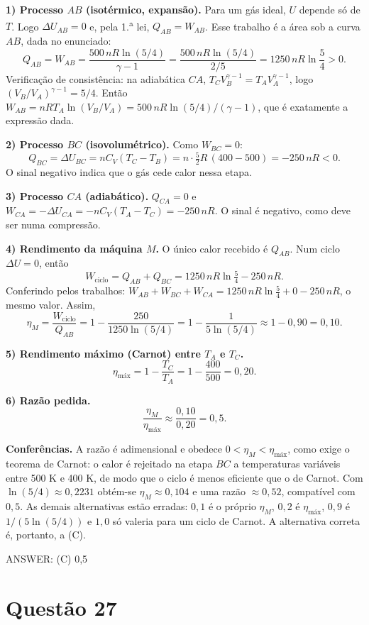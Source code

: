 \documentclass{article}%
\begin{document}
\textbf{1) Processo $AB$ (isotérmico, expansão).} Para um gás ideal, $U$ depende só de $T$. Logo $\Delta U_{AB}=0$ e, pela 1.\textsuperscript{a} lei, $Q_{AB}=W_{AB}$. Esse trabalho é a área sob a curva $AB$, dada no enunciado:
\[
Q_{AB}=W_{AB}=\frac{500\,nR\ln(5/4)}{\gamma-1}=\frac{500\,nR\ln(5/4)}{2/5}=1250\,nR\ln\frac{5}{4}>0 .
\]
Verificação de consistência: na adiabática $CA$, $T_C V_B^{\gamma-1}=T_A V_A^{\gamma-1}$, logo $(V_B/V_A)^{\gamma-1}=5/4$. Então $W_{AB}=nRT_A\ln(V_B/V_A)=500\,nR\ln(5/4)/(\gamma-1)$, que é exatamente a expressão dada.

\textbf{2) Processo $BC$ (isovolumétrico).} Como $W_{BC}=0$:
\[
Q_{BC}=\Delta U_{BC}=nC_V(T_C-T_B)=n\cdot\tfrac{5}{2}R\,(400-500)=-250\,nR<0 .
\]
O sinal negativo indica que o gás cede calor nessa etapa.

\textbf{3) Processo $CA$ (adiabático).} $Q_{CA}=0$ e $W_{CA}=-\Delta U_{CA}=-nC_V(T_A-T_C)=-250\,nR$. O sinal é negativo, como deve ser numa compressão.

\textbf{4) Rendimento da máquina $M$.} O único calor recebido é $Q_{AB}$. Num ciclo $\Delta U=0$, então
\[
W_{\text{ciclo}}=Q_{AB}+Q_{BC}=1250\,nR\ln\tfrac54-250\,nR .
\]
Conferindo pelos trabalhos: $W_{AB}+W_{BC}+W_{CA}=1250\,nR\ln\tfrac54+0-250\,nR$, o mesmo valor. Assim,
\[
\eta_M=\frac{W_{\text{ciclo}}}{Q_{AB}}=1-\frac{250}{1250\ln(5/4)}=1-\frac{1}{5\ln(5/4)}\approx 1-0{,}90=0{,}10 .
\]

\textbf{5) Rendimento máximo (Carnot) entre $T_A$ e $T_C$.}
\[
\eta_{\text{máx}}=1-\frac{T_C}{T_A}=1-\frac{400}{500}=0{,}20 .
\]

\textbf{6) Razão pedida.}
\[
\frac{\eta_M}{\eta_{\text{máx}}}\approx\frac{0{,}10}{0{,}20}=0{,}5 .
\]

\textbf{Conferências.} A razão é adimensional e obedece $0<\eta_M<\eta_{\text{máx}}$, como exige o teorema de Carnot: o calor é rejeitado na etapa $BC$ a temperaturas variáveis entre 500 K e 400 K, de modo que o ciclo é menos eficiente que o de Carnot. Com $\ln(5/4)\approx0{,}2231$ obtém-se $\eta_M\approx0{,}104$ e uma razão $\approx0{,}52$, compatível com $0{,}5$. As demais alternativas estão erradas: $0{,}1$ é o próprio $\eta_M$, $0{,}2$ é $\eta_{\text{máx}}$, $0{,}9$ é $1/(5\ln(5/4))$ e $1{,}0$ só valeria para um ciclo de Carnot. A alternativa correta é, portanto, a (C).

ANSWER: (C) 0,5%
\newpage%
\section*{Questão 27}
\end{document}
